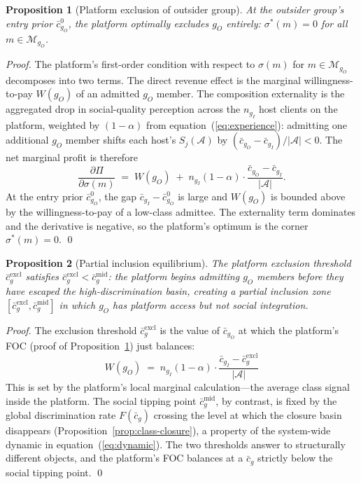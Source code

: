 \documentclass[pdflatex,sn-basic]{sn-jnl}
\newcommand{\M}{\mathcal{M}}
\theoremstyle{thmstyleone}
\newtheorem{proposition}{Proposition}
\numberwithin{proposition}{subsection}
\begin{document}
\begin{proposition}[Platform exclusion of outsider group]
\label{prop:exclusion}
At the outsider group's entry prior $\bar{c}_{g_O}^0$, the platform
optimally excludes $g_O$ entirely:
$\sigma^*(m) = 0$ for all $m \in \M_{g_O}$.
\end{proposition}

\begin{proof}
The platform's first-order condition with respect to
$\sigma(m)$ for $m \in \M_{g_O}$ decomposes into two terms. The
direct revenue effect is the marginal willingness-to-pay $W(g_O)$ of
an admitted $g_O$ member. The composition externality is the
aggregated drop in social-quality perception across the $n_{g_I}$
host clients on the platform, weighted by $(1 - \alpha)$ from
equation~(\ref{eq:experience}): admitting one additional $g_O$
member shifts each host's $S_j(\mathcal{A})$ by
$(\bar{c}_{g_O} - \bar{c}_{g_I})/|\mathcal{A}| < 0$. The net
marginal profit is therefore
\[
  \frac{\partial \Pi}{\partial \sigma(m)} \;=\;
  W(g_O) \;+\; n_{g_I} (1 - \alpha)
  \cdot \frac{\bar{c}_{g_O} - \bar{c}_{g_I}}{|\mathcal{A}|}.
\]
At the entry prior $\bar{c}_{g_O}^0$, the gap
$\bar{c}_{g_I} - \bar{c}_{g_O}^0$ is large and $W(g_O)$ is bounded
above by the willingness-to-pay of a low-class admittee. The
externality term dominates and the derivative is negative, so the
platform's optimum is the corner $\sigma^*(m) = 0$.
\qed
\end{proof}

\begin{proposition}[Partial inclusion equilibrium]
\label{prop:tokenism}
The platform exclusion threshold $\bar{c}_g^{\mathrm{excl}}$ satisfies
$\bar{c}_g^{\mathrm{excl}} < \bar{c}_g^{\mathrm{mid}}$: the platform begins
admitting $g_O$ members \emph{before} they have escaped the
high-discrimination basin, creating a partial inclusion zone
$[\bar{c}_g^{\mathrm{excl}}, \bar{c}_g^{\mathrm{mid}}]$ in which $g_O$ has
platform access but not social integration.
\end{proposition}

\begin{proof}
The exclusion threshold $\bar{c}_g^{\mathrm{excl}}$ is the value of
$\bar{c}_{g_O}$ at which the platform's FOC (proof of
Proposition~\ref{prop:exclusion}) just balances:
\[
  W(g_O) \;=\; n_{g_I} (1 - \alpha)
  \cdot \frac{\bar{c}_{g_I} - \bar{c}_g^{\mathrm{excl}}}{|\mathcal{A}|}
\]
This is set by the platform's local marginal calculation---the
average class signal inside the platform. The social tipping point
$\bar{c}_g^{\mathrm{mid}}$, by contrast, is fixed by the global
discrimination rate $F(\bar{c}_g)$ crossing the level at which the
closure basin disappears (Proposition~\ref{prop:class-closure}), a
property of the system-wide dynamic in
equation~(\ref{eq:dynamic}). The two thresholds answer to
structurally different objects, and the platform's FOC balances at a
$\bar{c}_g$ strictly below the social tipping point. \qed
\end{proof}
\end{document}
